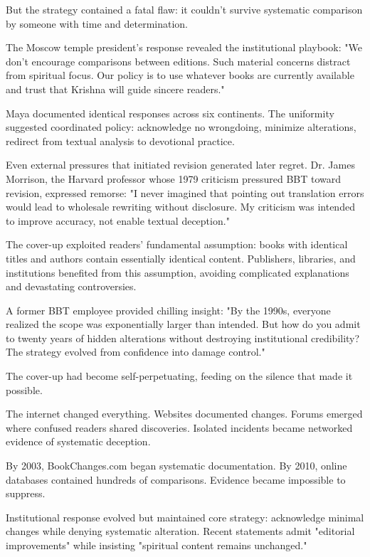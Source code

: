 \documentclass[11pt,twoside]{book}
\begin{document}
But the strategy contained a fatal flaw: it couldn't survive systematic comparison by someone with time and determination.

The Moscow temple president's response revealed the institutional playbook: "We don't encourage comparisons between editions. Such material concerns distract from spiritual focus. Our policy is to use whatever books are currently available and trust that Krishna will guide sincere readers."

Maya documented identical responses across six continents. The uniformity suggested coordinated policy: acknowledge no wrongdoing, minimize alterations, redirect from textual analysis to devotional practice.

Even external pressures that initiated revision generated later regret. Dr. James Morrison, the Harvard professor whose 1979 criticism pressured BBT toward revision, expressed remorse: "I never imagined that pointing out translation errors would lead to wholesale rewriting without disclosure. My criticism was intended to improve accuracy, not enable textual deception."

The cover-up exploited readers' fundamental assumption: books with identical titles and authors contain essentially identical content. Publishers, libraries, and institutions benefited from this assumption, avoiding complicated explanations and devastating controversies.

A former BBT employee provided chilling insight: "By the 1990s, everyone realized the scope was exponentially larger than intended. But how do you admit to twenty years of hidden alterations without destroying institutional credibility? The strategy evolved from confidence into damage control."

The cover-up had become self-perpetuating, feeding on the silence that made it possible.

The internet changed everything. Websites documented changes. Forums emerged where confused readers shared discoveries. Isolated incidents became networked evidence of systematic deception.

By 2003, BookChanges.com began systematic documentation. By 2010, online databases contained hundreds of comparisons. Evidence became impossible to suppress.

Institutional response evolved but maintained core strategy: acknowledge minimal changes while denying systematic alteration. Recent statements admit "editorial improvements" while insisting "spiritual content remains unchanged."
\end{document}

